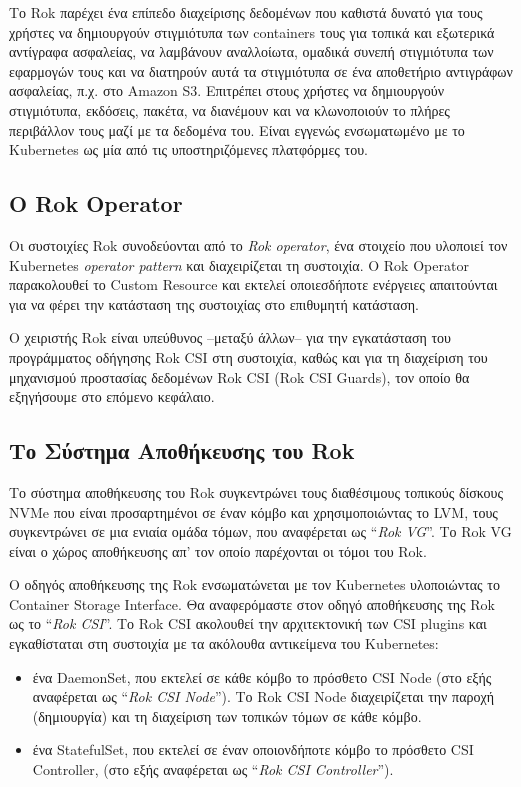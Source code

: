 Το Rok παρέχει ένα επίπεδο διαχείρισης δεδομένων που καθιστά δυνατό για τους
χρήστες να δημιουργούν στιγμιότυπα των containers τους για τοπικά και εξωτερικά
αντίγραφα ασφαλείας, να λαμβάνουν αναλλοίωτα, ομαδικά συνεπή στιγμιότυπα των
εφαρμογών τους και να διατηρούν αυτά τα στιγμιότυπα σε ένα αποθετήριο αντιγράφων
ασφαλείας, π.χ. στο Amazon S3. Επιτρέπει στους χρήστες να δημιουργούν
στιγμιότυπα, εκδόσεις, πακέτα, να διανέμουν και να κλωνοποιούν το πλήρες
περιβάλλον τους μαζί με τα δεδομένα του. Είναι εγγενώς ενσωματωμένο με το
Kubernetes ως μία από τις υποστηριζόμενες πλατφόρμες του.

\subsection{Ο Rok Operator}

Οι συστοιχίες Rok συνοδεύονται από το \textit{Rok operator}, ένα στοιχείο που
 υλοποιεί τον Kubernetes \textit{operator pattern}  και διαχειρίζεται τη
 συστοιχία. Ο Rok Operator παρακολουθεί το  Custom Resource και
 εκτελεί οποιεσδήποτε ενέργειες απαιτούνται για να φέρει την κατάσταση της
 συστοιχίας στο επιθυμητή κατάσταση.

Ο χειριστής Rok είναι υπεύθυνος --μεταξύ άλλων-- για την εγκατάσταση του
προγράμματος οδήγησης Rok CSI στη συστοιχία, καθώς και για τη διαχείριση του
μηχανισμού προστασίας δεδομένων Rok CSI (Rok CSI Guards), τον οποίο θα
εξηγήσουμε στο επόμενο κεφάλαιο.

\subsection{Το Σύστημα Αποθήκευσης του Rok}
\label{section:gr-background-rok-csi}

Το σύστημα αποθήκευσης του Rok συγκεντρώνει τους διαθέσιμους τοπικούς δίσκους
NVMe που είναι προσαρτημένοι σε έναν κόμβο και χρησιμοποιώντας το LVM, τους
συγκεντρώνει σε μια ενιαία ομάδα τόμων, που αναφέρεται ως ``\textit{Rok VG}''.
Το Rok VG είναι ο χώρος αποθήκευσης απ' τον οποίο παρέχονται οι τόμοι του Rok.

Ο οδηγός αποθήκευσης της Rok ενσωματώνεται με τον Kubernetes υλοποιώντας το
Container Storage Interface. Θα αναφερόμαστε στον οδηγό αποθήκευσης της Rok ως
το ``\textit{Rok CSI}''. Το Rok CSI ακολουθεί την αρχιτεκτονική των CSI plugins
και εγκαθίσταται στη συστοιχία με τα ακόλουθα αντικείμενα του Kubernetes:
\begin{itemize}
      \item ένα DaemonSet, που εκτελεί σε κάθε κόμβο το πρόσθετο CSI Node (στο
            εξής αναφέρεται ως ``\textit{Rok CSI Node}''). Το Rok CSI Node
            διαχειρίζεται την παροχή (δημιουργία) και τη διαχείριση των τοπικών
            τόμων σε κάθε κόμβο.
      \item ένα StatefulSet, που εκτελεί σε έναν οποιονδήποτε κόμβο το πρόσθετο
            CSI Controller, (στο εξής αναφέρεται ως ``\textit{Rok CSI
            Controller}'').
\end{itemize}


